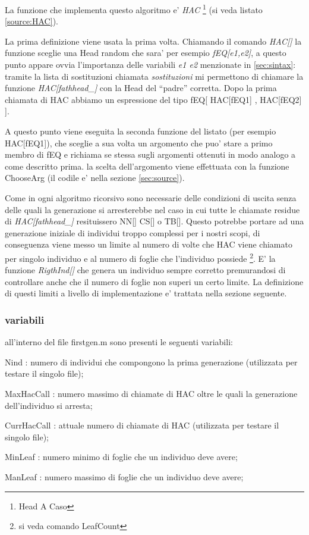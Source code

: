 \documentclass[12pt, a4paper]{article}
\begin{document}
La funzione che implementa questo algoritmo e' {\itshape HAC} \footnote{Head A Caso} (si veda listato \ref{source:HAC}).

La prima definizione viene usata la prima volta. Chiamando il comando {\itshape HAC[]} la funzione sceglie una Head random che sara' per esempio {\itshape fEQ[e1,e2]}, a questo punto appare ovvia l'importanza delle variabili {\itshape e1 e2} menzionate in \ref{sec:sintax}: tramite la lista di sostituzioni chiamata {\itshape sostituzioni} mi permettono di chiamare la funzione {\itshape HAC[fathhead\_]} con la Head del ``padre'' corretta. Dopo la prima chiamata di HAC abbiamo un espressione del tipo fEQ[ HAC[fEQ1] , HAC[fEQ2] ]. 

A questo punto viene eseguita la seconda funzione del listato (per esempio HAC[fEQ1]), che sceglie a sua volta un argomento che puo' stare a primo membro di fEQ e richiama se stessa sugli argomenti ottenuti in modo analogo a come descritto prima. la scelta dell'argomento viene effettuata con la funzione ChooseArg (il codile e' nella sezione \ref{sec:source}).

Come in ogni algoritmo ricorsivo sono necessarie delle condizioni di uscita senza delle quali la generazione si arresterebbe nel caso in cui tutte le chiamate residue di {\itshape HAC[fathhead\_]} resituissero NN[] CS[] o TB[]. Questo potrebbe portare ad una generazione iniziale di individui troppo complessi per i nostri scopi, di conseguenza viene messo un limite al numero di volte che HAC viene chiamato per singolo individuo e al numero di foglie che l'individuo possiede \footnote{si veda comando LeafCount}.
E' la funzione {\itshape RigthInd[]} che genera un individuo sempre corretto premurandosi di controllare anche che il numero di foglie non superi un certo limite.
La definizione di questi limiti a livello di implementazione e' trattata nella sezione seguente.

\subsubsection{variabili}
all'interno del file firstgen.m sono presenti le seguenti variabili:
\begin{description}
	\item{Nind : } numero di individui che compongono la prima generazione (utilizzata per testare il singolo file);
	\item{MaxHacCall : } numero massimo di chiamate di HAC oltre le quali la generazione dell'individuo si arresta;
	\item{CurrHacCall : } attuale numero di chiamate di HAC (utilizzata per testare il singolo file);
	\item{MinLeaf : } numero minimo di foglie che un individuo deve avere;
	\item{ManLeaf : } numero massimo di foglie che un individuo deve avere;
\end{description}
\end{document}

